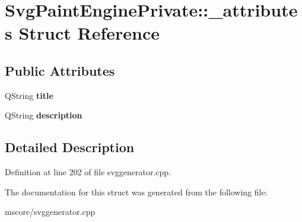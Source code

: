 \hypertarget{struct_svg_paint_engine_private_1_1__attributes}{}\section{Svg\+Paint\+Engine\+Private\+:\+:\+\_\+attributes Struct Reference}
\label{struct_svg_paint_engine_private_1_1__attributes}
\subsection*{Public Attributes}
\begin{DoxyCompactItemize}
\item 
\mbox{\label{struct_svg_paint_engine_private_1_1__attributes_a7fd8df3327a5eefaced9077403cba858}} 
Q\+String {\bfseries title}
\item 
\mbox{\label{struct_svg_paint_engine_private_1_1__attributes_a8979c1061928b6792c0b2b918bce46ac}} 
Q\+String {\bfseries description}
\end{DoxyCompactItemize}


\subsection{Detailed Description}


Definition at line 202 of file svggenerator.\+cpp.



The documentation for this struct was generated from the following file\+:\begin{DoxyCompactItemize}
\item 
mscore/svggenerator.\+cpp\end{DoxyCompactItemize}
